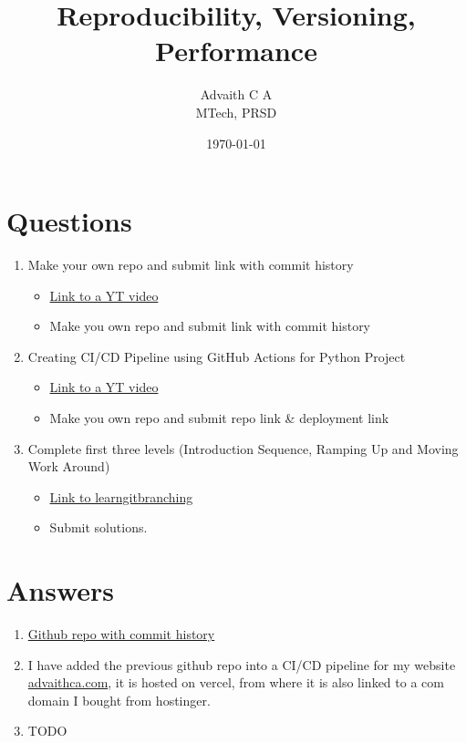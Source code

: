 \documentclass{article}
\title{Reproducibility, Versioning, Performance}
\author{Advaith C A \\MTech, PRSD}
\date{\today}
\begin{document}
    \maketitle
    \section*{Questions}
    \begin{enumerate}
        \item Make your own repo and submit link with commit history
        \begin{itemize}
            \item \href{https://www.youtube.com/watch?v=8Dd7KRpKeaE}{Link to a YT video}
            \item Make you own repo and submit link with commit history
        \end{itemize}
        \item Creating CI/CD Pipeline using GitHub Actions for Python Project
        \begin{itemize}
            \item \href{https://www.youtube.com/watch?v=WTofttoD2xg}{Link to a YT video}
            \item Make you own repo and submit repo link \& deployment link
        \end{itemize}
        \item Complete first three levels (Introduction Sequence, Ramping Up and Moving Work Around)
        \begin{itemize}
            \item \href{https://learngitbranching.js.org/}{Link to learngitbranching}
            \item Submit solutions.
        \end{itemize}
    \end{enumerate}

    \section*{Answers}
    \begin{enumerate}
        \item \href{https://github.com/advaithca/advaithca.github.io/tree/master}{Github repo with commit history}
        \item I have added the previous github repo into a CI/CD pipeline for my website \href{https://advaithca.com}{advaithca.com}, it is hosted on vercel, from where it is also linked to a com domain I bought from hostinger.
        \item TODO
    \end{enumerate}
\end{document}
